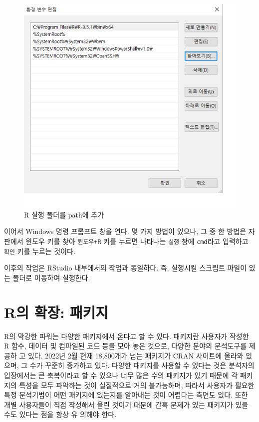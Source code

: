 \documentclass[
]{book}
\begin{document}
\begin{figure}
\includegraphics[width=7.74in]{Figure/path_adding} \caption{R 실행 폴더를 path에 추가}\label{fig:path-adding}
\end{figure}

이어서 Windows 명령 프롬프트 창을 연다. 몇 가지 방법이 있으나, 그 중 한
방법은 자판에서 윈도우 키를 찾아 \texttt{윈도우+R} 키를 누르면 나타나는 \texttt{실행}
창에 \texttt{cmd}라고 입력하고 \texttt{확인} 키를 누르는 것이다.

이후의 작업은 RStudio 내부에서의 작업과 동일하다. 즉, 실행시킬 스크립트
파일이 있는 폴더로 이동하여 실행한다.

\hypertarget{section-package}{%
\section{R의 확장: 패키지}\label{section-package}}

R의 막강한 파워는 다양한 패키지에서 온다고 할 수 있다. 패키지란 사용자가
작성한 R 함수, 데이터 및 컴파일된 코드 등을 모아 놓은 것으로, 다양한
분야의 분석도구를 제공하 고 있다. 2022년 2월 현재 18,800개가 넘는
패키지가 CRAN 사이트에 올라와 있으며, 그 수가 꾸준히 증가하고 있다.
다양한 패키지를 사용할 수 있다는 것은 분석자의 입장에서는 큰 축복이라고
할 수 있으나 너무 많은 수의 패키지가 있기 때문에 각 패키지의 특성을 모두 파악하는 것이
실질적으로 거의 불가능하며, 따라서 사용자가 필요한 특정
분석기법이 어떤 패키지에 있는지를 알아내는 것이 어렵다는 측면도 있다.
또한 개별 사용자들이 직접 작성해서 올린 것이기 때문에 간혹 문제가 있는
패키지가 있을 수도 있다는 점을 항상 유 의해야 한다.
\end{document}

